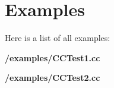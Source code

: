 \section{Examples}
Here is a list of all examples\+:\begin{DoxyCompactItemize}
\item 
\textbf{ /examples/\+C\+C\+Test1.\+cc}
\item 
\textbf{ /examples/\+C\+C\+Test2.\+cc}
\end{DoxyCompactItemize}

